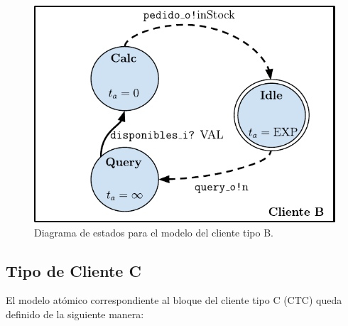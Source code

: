 \documentclass[10pt]{article}
\begin{document}
\begin{figure}[htbp]
	\centering
	\includegraphics{img/clienteBdevsgraph}
	\caption{Diagrama de estados para el modelo del cliente tipo B.}
	\label{fig:CTB-estados}
\end{figure}

\subsection{Tipo de Cliente C\label{sec:CTC}}

El modelo atómico correspondiente al bloque del cliente tipo C (CTC) queda definido de la siguiente manera:
\end{document}
